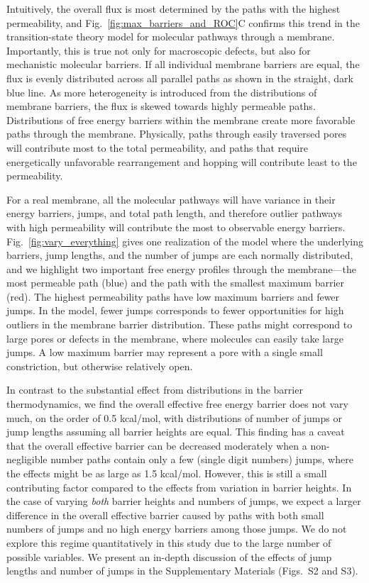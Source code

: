 \documentclass[12pt]{article}
\begin{document}
Intuitively, the overall flux is most determined by the paths with the highest permeability, and Fig.~\ref{fig:max_barriers_and_ROC}C confirms this trend in the transition-state theory model for molecular pathways through a membrane. Importantly, this is true not only for macroscopic defects, but also for mechanistic molecular barriers. If all individual membrane barriers are equal, the flux is evenly distributed across all parallel paths as shown in the straight, dark blue line. As more heterogeneity is introduced from the distributions of membrane barriers, the flux is skewed towards highly permeable paths. Distributions of free energy barriers within the membrane create more favorable paths through the membrane. Physically, paths through easily traversed pores will contribute most to the total permeability, and paths that require energetically unfavorable rearrangement and hopping will contribute least to the permeability. 

For a real membrane, all the molecular pathways will have variance in their energy barriers, jumps, and total path length, and therefore outlier pathways with high permeability will contribute the most to observable energy barriers. Fig.~\ref{fig:vary_everything} gives one realization of the model where the underlying barriers, jump lengths, and the number of jumps are each normally distributed, and we highlight two important free energy profiles through the membrane---the most permeable path (blue) and the path with the smallest maximum barrier (red). The highest permeability paths have low maximum barriers and fewer jumps. In the model, fewer jumps corresponds to fewer opportunities for high outliers in the membrane barrier distribution. These paths might correspond to large pores or defects in the membrane, where molecules can easily take large jumps. A low maximum barrier may represent a pore with a single small constriction, but otherwise relatively open. 

In contrast to the substantial effect from distributions in the barrier thermodynamics, we find the overall effective free energy barrier does not vary much, on the order of 0.5 kcal/mol, with distributions of number of jumps or jump lengths assuming all barrier heights are equal. This finding has a caveat that the overall effective barrier can be decreased moderately when a non-negligible number paths contain only a few (single digit numbers) jumps, where the effects might be as large as 1.5 kcal/mol. However, this is still a small contributing factor compared to the effects from variation in barrier heights. In the case of varying \textit{both} barrier heights and numbers of jumps, we expect a larger difference in the overall effective barrier caused by paths with both small numbers of jumps and no high energy barriers among those jumps. We do not explore this regime quantitatively in this study due to the large number of possible variables.  We present an in-depth discussion of the effects of jump lengths and number of jumps in the Supplementary Materials (Figs.~S2 and S3).
\end{document}
